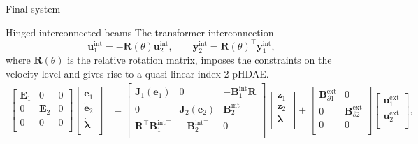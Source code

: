 \documentclass[aspectratio=169]{ISAE-Beamer}
\begin{document}
\begin{frame}{Final system}
\begin{block}{Hinged interconnected beams}
The transformer interconnection
\begin{equation*}
\mathbf{u}_1^{\text{int}} = -\mathbf{R}(\theta) \mathbf{u}_2^{\text{int}}, \qquad
\mathbf{y}_2^{\text{int}} = \mathbf{R}(\theta)^\top \mathbf{y}_1^{\text{int}},
\end{equation*}
where $\mathbf{R}(\theta)$ is the relative rotation matrix,	imposes the constraints on the velocity level and gives rise to a quasi-linear index 2 pHDAE.
\begin{equation*}
\begin{aligned}
\begin{bmatrix}
\mathbf{E}_1 & 0 & 0 \\ 
0 & \mathbf{E}_2 & 0 \\
0 & 0 & 0 \\
\end{bmatrix}
\begin{bmatrix}
\dot{\mathbf{e}}_1 \\ \dot{\mathbf{e}}_2 \\ \dot{\bm{\lambda}} \\
\end{bmatrix} &= 
\begin{bmatrix}
\mathbf{J}_1(\mathbf{e}_1) & 0 & -\mathbf{B}_1^{\text{int}} \mathbf{R} \\ 
0 & \mathbf{J}_2(\mathbf{e}_2) & \mathbf{B}_2^{\text{int}} \\
\mathbf{R}^\top \mathbf{B}_1^{\text{int} \top} & - \mathbf{B}_2^{\text{int} \top} & 0 \\
\end{bmatrix}
\begin{bmatrix}
\mathbf{z}_1  \\ 
\mathbf{z}_2  \\ 
\bm{\lambda} \\
\end{bmatrix}+ 
\begin{bmatrix}
\mathbf{B}_{\partial 1}^{\text{ext}} & 0 \\ 0 & \mathbf{B}_{\partial 2}^{\text{ext}} \\ 0 & 0 \\
\end{bmatrix} 
\begin{bmatrix}
\mathbf{u}_1^{\text{ext}} \\ 
\mathbf{u}_2^{\text{ext}} \\
\end{bmatrix}, \\

\end{aligned}
\end{equation*}
\end{block}
\end{frame}
\end{document}
